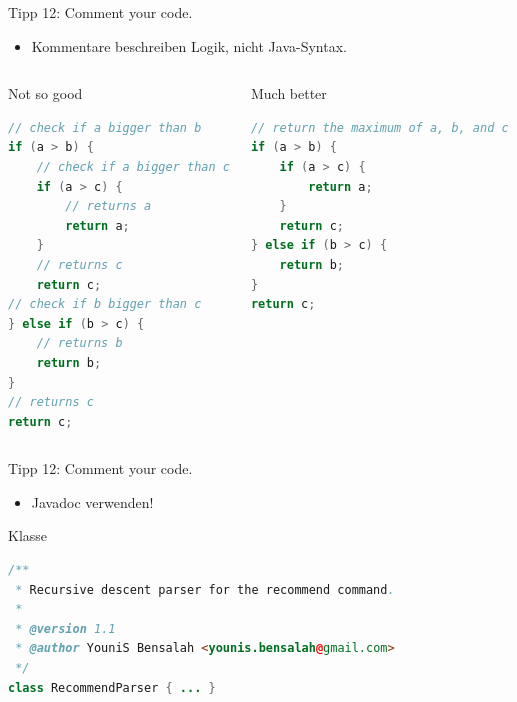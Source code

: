 \documentclass[18pt]{beamer}
\begin{document}
\begin{frame}[fragile]{Tipp 12: Comment your code.}
    \begin{itemize}
        \item Kommentare beschreiben Logik, nicht Java-Syntax.
    \end{itemize}
    \begin{columns}[c]
        \begin{alertblock}{Not so good}
            \begin{lstlisting}[language=Java,basicstyle=\scriptsize]
// check if a bigger than b
if (a > b) {
    // check if a bigger than c
    if (a > c) {
        // returns a
        return a;
    }
    // returns c
    return c;
// check if b bigger than c
} else if (b > c) {
    // returns b
    return b;
}
// returns c
return c;
            \end{lstlisting}
        \end{alertblock}
        \begin{exampleblock}{Much better}
            \begin{lstlisting}[language=Java,basicstyle=\scriptsize]
// return the maximum of a, b, and c
if (a > b) {
    if (a > c) {
        return a;
    }
    return c;
} else if (b > c) {
    return b;
}
return c;
            \end{lstlisting}
        \end{exampleblock}
    \end{columns}
\end{frame}

\begin{frame}[fragile]{Tipp 12: Comment your code.}
    \begin{itemize}
        \item Javadoc verwenden!
    \end{itemize}
    \begin{exampleblock}{Klasse}
        \begin{lstlisting}[language=Java,basicstyle=\tiny]
/**
 * Recursive descent parser for the recommend command.
 *
 * @version 1.1
 * @author YouniS Bensalah <younis.bensalah@gmail.com>
 */
class RecommendParser { ... }
        \end{lstlisting}
    \end{exampleblock}
\end{frame}
\end{document}
